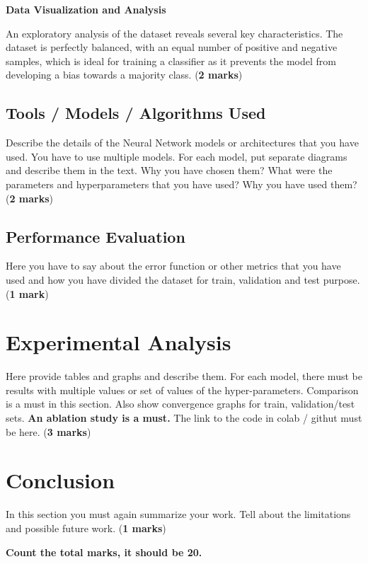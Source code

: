 \documentclass{article}
\begin{document}
\textbf{Data Visualization and Analysis}

An exploratory analysis of the dataset reveals several key characteristics. The dataset is perfectly balanced, with an equal number of positive and negative samples, which is ideal for training a classifier as it prevents the model from developing a bias towards a majority class. (\textbf{2 marks})

\subsection{Tools / Models / Algorithms Used}
Describe the details of the Neural Network models or architectures that you have used. You have to use multiple models. For each model, put separate diagrams and describe them in the text. Why you have chosen them? What were the parameters and hyperparameters that you have used? Why you have used them? (\textbf{2 marks})

\subsection{Performance Evaluation}
Here you have to say about the error function or other metrics that you have used and how you have divided the dataset for train, validation and test purpose. (\textbf{1 mark})

\section{Experimental Analysis}
Here provide tables and graphs and describe them. For each model, there must be results with multiple values or set of values of the hyper-parameters. Comparison is a must in this section. Also show convergence graphs for train, validation/test sets. \textbf{An ablation study is a must.} The link to the code in colab / githut must be here. 
(\textbf{3 marks})
\section{Conclusion}
In this section you must again summarize your work. Tell about the limitations and possible future work. (\textbf{1 marks})

\noindent
\textbf{Count the total marks, it should be 20.}



\end{document}
